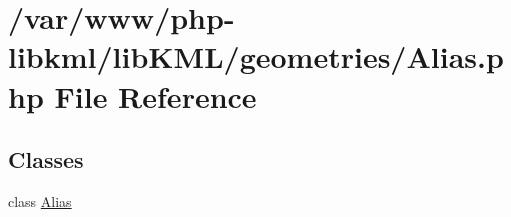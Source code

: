 \hypertarget{Alias_8php}{
\section{/var/www/php-\/libkml/libKML/geometries/Alias.php File Reference}
\label{df/d19/Alias_8php}
}
\subsection*{Classes}
\begin{DoxyCompactItemize}
\item 
class \hyperlink{classAlias}{Alias}
\end{DoxyCompactItemize}
